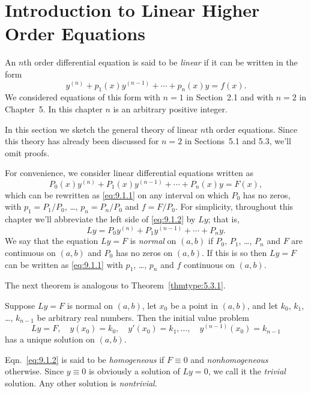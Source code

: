 \section{Introduction to Linear Higher Order Equations}

\noindent
An $n$th order differential equation is said to be {\color{blue}\it linear} if it can be written in
the form
\begin{equation}
  \label{eq:9.1.1}y^{(n)}+p_{1}(x)y^{(n-1)}+\cdots+p_{n}(x)y=f(x).
\end{equation}
We considered equations of this form with $n=1$ in Section~2.1 and with $n=2$ in Chapter~5. In this
chapter $n$ is an arbitrary positive integer.

In this section we sketch the general theory of linear $n$th order equations. Since this theory has
already been discussed for $n=2$ in Sections~5.1 and 5.3, we'll omit proofs.

For convenience, we consider linear differential equations written as
\begin{equation}
  \label{eq:9.1.2}P_{0}(x)y^{(n)}+P_{1}(x)y^{(n-1)}+\cdots+P_{n}(x)y=F(x),
\end{equation}
which can be rewritten as \eqref{eq:9.1.1} on any interval on which $P_{0}$ has no zeros, with
$p_{1}=P_{1}/P_{0}$, \dots, $p_{n}=P_{n}/P_{0}$ and $f=F/P_{0}$. For simplicity, throughout this
chapter we'll abbreviate the left side of \eqref{eq:9.1.2} by $Ly$; that is,
\[
  Ly=P_{0}y^{(n)}+P_{1}y^{(n-1)}+\cdots+P_{n}y.
\]
We say that the equation $Ly=F$ is {\color{blue}\it normal\/} on $(a,b)$ if $P_{0}$, $P_{1}$, \dots,
$P_{n}$ and $F$ are continuous on $(a,b)$ and $P_{0}$ has no zeros on $(a,b)$. If this is so then
$Ly=F$ can be written as \eqref{eq:9.1.1} with $p_{1}$, \dots, $p_{n}$ and $f$ continuous on
$(a,b)$.

The next theorem is analogous to Theorem~\ref{thmtype:5.3.1}.

\begin{theorem}
  \color{blue}
  \label{thmtype:9.1.1} Suppose $Ly=F$ is normal on $(a,b)$, let $x_{0}$ be a point in $(a,b)$, and
  let $k_{0}$, $k_{1}$, \dots, $k_{n-1}$ be arbitrary real numbers. Then the initial value problem
  \[
    Ly=F,\quad y(x_{0})=k_{0},\quad y'(x_{0})=k_{1},\dots,\quad y^{(n-1)}(x_{0})=k_{n-1}
  \]
  has a unique solution on $(a,b)$.
\end{theorem}


\noindent
Eqn.~\eqref{eq:9.1.2} is said to be {\color{blue}\it homogeneous} if $F\equiv0$ and {\color{blue}\it
nonhomogeneous} otherwise. Since $y\equiv0$ is obviously a solution of $Ly=0$, we call it the
{\color{blue}\it trivial} solution. Any other solution is {\color{blue}\it nontrivial}.

